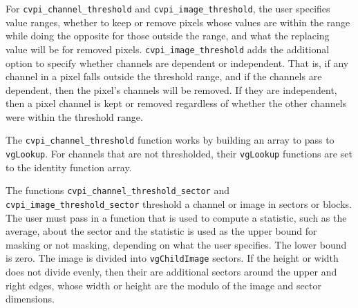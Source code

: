 \documentclass[12pt]{report}
\begin{document}
For {\tt cvpi\_channel\_threshold} and {\tt cvpi\_image\_threshold},
the user specifies value ranges, whether to keep or remove pixels
whose values are within the range while doing the opposite for those
outside the range, and what the replacing value will be for removed
pixels. {\tt cvpi\_image\_threshold} adds the additional option to
specify whether channels are dependent or independent. That is, if any
channel in a pixel falls outside the threshold range, and if the
channels are dependent, then the pixel's channels will be removed. If they
are independent, then a pixel channel is kept or removed regardless of
whether the other channels were within the threshold range.

The {\tt cvpi\_channel\_threshold} function works by building an array to
pass to {\tt vgLookup}. For channels that are not thresholded, their
{\tt vgLookup} functions are set to the identity function array.

The functions {\tt cvpi\_channel\_threshold\_sector} and {\tt
  cvpi\_image\_threshold\_sector} threshold a channel or image in
sectors or blocks. The user must pass in a function that is used to
compute a statistic, such as the average, about the sector and the
statistic is used as the upper bound for masking or not masking,
depending on what the user specifies. The lower bound is zero. The
image is divided into {\tt vgChildImage} sectors. If the height or
width does not divide evenly, then their are additional sectors around
the upper and right edges, whose width or height are the modulo of the
image and sector dimensions.
\end{document}
